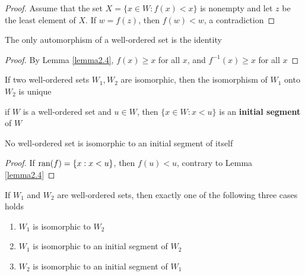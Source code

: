 \documentclass[11pt]{article}
\begin{document}
\begin{proof}
Assume that the set \(X=\{x\in W:f(x)<x\}\) is nonempty and let \(z\) be the least element of \(X\).
If \(w=f(z)\), then \(f(w)<w\), a contradiction
\end{proof}

\begin{corollary}[]
The only automorphism of a well-ordered set is the identity
\end{corollary}

\begin{proof}
By Lemma \ref{lemma2.4}, \(f(x)\ge x\) for all \(x\), and \(f^{-1}(x)\ge x\) for all \(x\)
\end{proof}

\begin{corollary}[]
If two well-ordered sets \(W_1,W_2\) are isomorphic, then the isomorphism of \(W_1\) onto \(W_2\) is unique
\end{corollary}

if \(W\) is a well-ordered set and \(u\in W\), then \(\{x\in W:x<u\}\) is an \textbf{initial segment} of \(W\)

\begin{lemma}[]
\label{lemma2.7}
No well-ordered set is isomorphic to an initial segment of itself
\end{lemma}

\begin{proof}
If \(\operatorname{ran}(f)=\{x:x<u\}\), then \(f(u)<u\), contrary to Lemma \ref{lemma2.4}
\end{proof}

\begin{theorem}[]
\label{thm2.8}
If \(W_1\) and \(W_2\) are well-ordered sets, then exactly one of the following three cases holds
\begin{enumerate}
\item \(W_1\) is isomorphic to \(W_2\)
\item \(W_1\) is isomorphic to an initial segment of \(W_2\)
\item \(W_2\) is isomorphic to an initial segment of \(W_1\)
\end{enumerate}
\end{theorem}
\end{document}
